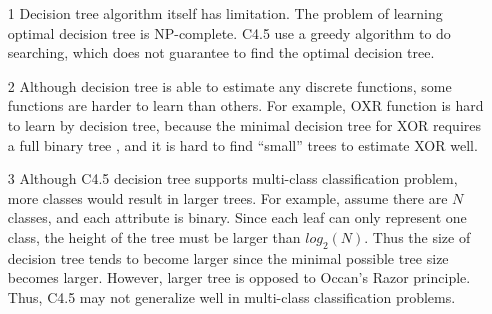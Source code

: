 \documentclass[a4paper,11pt]{article}
\begin{document}
\begin{enumerate}
\item[1] Decision tree algorithm itself has limitation. The problem of learning optimal decision tree is NP-complete\cite{dtnpc}. C4.5 use a greedy algorithm to do searching, which does not guarantee to find the optimal decision tree.
\item[2] Although decision tree is able to estimate any discrete functions, some functions are harder to learn than others. For example, OXR function is hard to learn by decision tree, because the minimal decision tree for XOR requires a full binary tree , and it is hard to find ``small'' trees to estimate XOR well.
\item[3] Although C4.5 decision tree supports multi-class classification problem, more classes would result in larger trees. For example, assume there are $N$ classes, and each attribute is binary. Since each leaf can only represent one class, the height of the tree must be larger than $log_2(N)$. Thus the size of decision tree tends to become larger since the minimal possible tree size becomes larger. However, larger tree is opposed to Occan's Razor principle. Thus, C4.5 may not generalize well in multi-class classification problems.
\end{enumerate}
\end{document}
